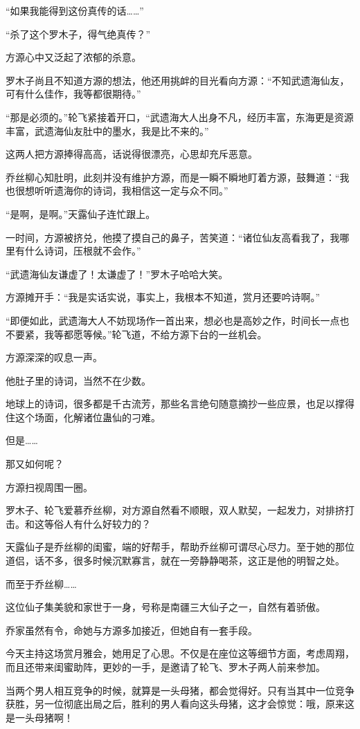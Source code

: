 \begin{this_body}
“如果我能得到这份真传的话……”

“杀了这个罗木子，得气绝真传？”

方源心中又泛起了浓郁的杀意。

罗木子尚且不知道方源的想法，他还用挑衅的目光看向方源：“不知武遗海仙友，可有什么佳作，我等都很期待。”

“那是必须的。”轮飞紧接着开口，“武遗海大人出身不凡，经历丰富，东海更是资源丰富，武遗海仙友肚中的墨水，我是比不来的。”

这两人把方源捧得高高，话说得很漂亮，心思却充斥恶意。

乔丝柳心知肚明，此刻并没有维护方源，而是一瞬不瞬地盯着方源，鼓舞道：“我也很想听听遗海你的诗词，我相信这一定与众不同。”

“是啊，是啊。”天露仙子连忙跟上。

一时间，方源被挤兑，他摸了摸自己的鼻子，苦笑道：“诸位仙友高看我了，我哪里有什么诗词，压根就不会作。”

“武遗海仙友谦虚了！太谦虚了！”罗木子哈哈大笑。

方源摊开手：“我是实话实说，事实上，我根本不知道，赏月还要吟诗啊。”

“即便如此，武遗海大人不妨现场作一首出来，想必也是高妙之作，时间长一点也不要紧，我等都愿等候。”轮飞道，不给方源下台的一丝机会。

方源深深的叹息一声。

他肚子里的诗词，当然不在少数。

地球上的诗词，很多都是千古流芳，那些名言绝句随意摘抄一些应景，也足以撑得住这个场面，化解诸位蛊仙的刁难。

但是……

那又如何呢？

方源扫视周围一圈。

罗木子、轮飞爱慕乔丝柳，对方源自然看不顺眼，双人默契，一起发力，对排挤打击。和这等俗人有什么好较力的？

天露仙子是乔丝柳的闺蜜，端的好帮手，帮助乔丝柳可谓尽心尽力。至于她的那位道侣，话不多，很多时候沉默寡言，就在一旁静静喝茶，这正是他的明智之处。

而至于乔丝柳……

这位仙子集美貌和家世于一身，号称是南疆三大仙子之一，自然有着骄傲。

乔家虽然有令，命她与方源多加接近，但她自有一套手段。

今天主持这场赏月雅会，她用足了心思。不仅是在座位这等细节方面，考虑周翔，而且还带来闺蜜助阵，更妙的一手，是邀请了轮飞、罗木子两人前来参加。

当两个男人相互竞争的时候，就算是一头母猪，都会觉得好。只有当其中一位竞争获胜，另一位彻底出局之后，胜利的男人看向这头母猪，这才会惊觉：哦，原来这是一头母猪啊！


\end{this_body}
